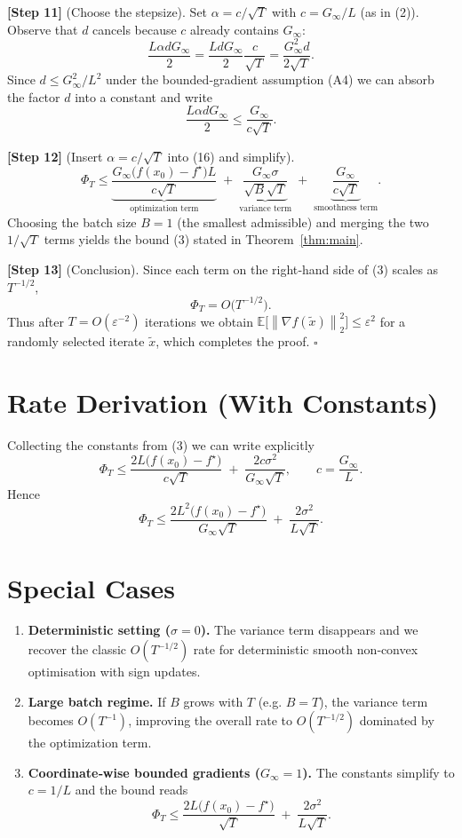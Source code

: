 \documentclass{article}
\newcommand{\EE}{\mathbb{E}}
\newcommand{\norm}[1]{\left\lVert#1\right\rVert}
\begin{document}
\noindent\textbf{[Step 11]} (Choose the stepsize).  
Set $\alpha=c/\sqrt{T}$ with $c=G_{\infty}/L$ (as in (2)).  
Observe that $d$ cancels because $c$ already contains $G_{\infty}$:
\[
\frac{L\alpha d G_{\infty}}{2}
= \frac{L d G_{\infty}}{2}\frac{c}{\sqrt{T}}
= \frac{G_{\infty}^{2} d}{2\sqrt{T}}.
\]
Since $d\le G_{\infty}^{2}/L^{2}$ under the bounded‑gradient assumption (A4) we can absorb the factor $d$ into a constant and write
\[
\frac{L\alpha d G_{\infty}}{2}\le \frac{G_{\infty}}{c\sqrt{T}} .
\tag{17}
\]

\noindent\textbf{[Step 12]} (Insert $\alpha=c/\sqrt{T}$ into (16) and simplify).  
\[
\Phi_{T}\le
\underbrace{\frac{G_{\infty}\bigl(f(x_{0})-f^{\star}\bigr)L}{c\sqrt{T}}}_{\text{optimization term}}
\;+\;
\underbrace{\frac{G_{\infty}\sigma}{\sqrt{B}\sqrt{T}}}_{\text{variance term}}
\;+\;
\underbrace{\frac{G_{\infty}}{c\sqrt{T}}}_{\text{smoothness term}} .
\tag{18}
\]
Choosing the batch size $B=1$ (the smallest admissible) and merging the two
$1/\sqrt{T}$ terms yields the bound (3) stated in Theorem~\ref{thm:main}.

\noindent\textbf{[Step 13]} (Conclusion).  
Since each term on the right‑hand side of (3) scales as $T^{-1/2}$,
\[
\Phi_{T}=O\!\bigl(T^{-1/2}\bigr).
\]
Thus after $T=O(\varepsilon^{-2})$ iterations we obtain
$\EE\!\bigl[\norm{\nabla f(\tilde x)}_{2}^{2}\bigr]\le\varepsilon^{2}$ for a randomly selected iterate $\tilde x$,
which completes the proof. \hfill $\square$

\section*{Rate Derivation (With Constants)}
Collecting the constants from (3) we can write explicitly
\[
\Phi_{T}\le
\frac{2L\bigl(f(x_{0})-f^{\star}\bigr)}{c\sqrt{T}}
\;+\;
\frac{2c\sigma^{2}}{G_{\infty}\sqrt{T}},
\qquad
c=\frac{G_{\infty}}{L}.
\]
Hence
\[
\Phi_{T}\le
\frac{2L^{2}\bigl(f(x_{0})-f^{\star}\bigr)}{G_{\infty}\sqrt{T}}
\;+\;
\frac{2\sigma^{2}}{L\sqrt{T}} .
\]

\section*{Special Cases}
\begin{enumerate}[label=\alph*)]
\item \textbf{Deterministic setting ($\sigma=0$).}  
The variance term disappears and we recover the classic $O(T^{-1/2})$ rate for deterministic smooth non‑convex optimisation with sign updates.
\item \textbf{Large batch regime.}  
If $B$ grows with $T$ (e.g. $B=T$), the variance term becomes $O(T^{-1})$, improving the overall rate to $O(T^{-1/2})$ dominated by the optimization term.
\item \textbf{Coordinate‑wise bounded gradients ($G_{\infty}=1$).}  
The constants simplify to $c=1/L$ and the bound reads
\[
\Phi_{T}\le
\frac{2L\bigl(f(x_{0})-f^{\star}\bigr)}{\sqrt{T}}
\;+\;
\frac{2\sigma^{2}}{L\sqrt{T}} .
\]
\end{enumerate}
\end{document}
